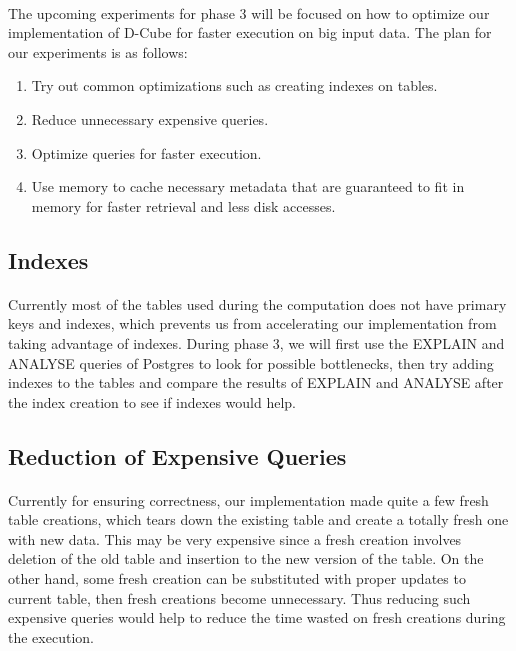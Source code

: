 \paragraph{} The upcoming experiments for phase 3 will be focused on how to optimize our implementation of D-Cube\cite{shin2017dcube} for faster execution on big input data. The plan for our experiments is as follows:
\begin{enumerate}
    \item Try out common optimizations such as creating indexes on tables.
    \item Reduce unnecessary expensive queries.
    \item Optimize queries for faster execution.
    \item Use memory to cache necessary metadata that are guaranteed to fit in memory for faster retrieval and less disk accesses.
\end{enumerate}
\subsection{Indexes}
\paragraph{} Currently most of the tables used during the computation does not have primary keys and indexes, which prevents us from accelerating our implementation from taking advantage of indexes. During phase 3, we will first use the EXPLAIN and ANALYSE queries of Postgres to look for possible bottlenecks, then try adding indexes to the tables and compare the results of EXPLAIN and ANALYSE after the index creation to see if indexes would help.
\subsection{Reduction of Expensive Queries}
\paragraph{} Currently for ensuring correctness, our implementation made quite a few fresh table creations, which tears down the existing table and create a totally fresh one with new data. This may be very expensive since a fresh creation involves deletion of the old table and insertion to the new version of the table. On the other hand, some fresh creation can be substituted with proper updates to current table, then fresh creations become unnecessary. Thus reducing such expensive queries would help to reduce the time wasted on fresh creations during the execution.
